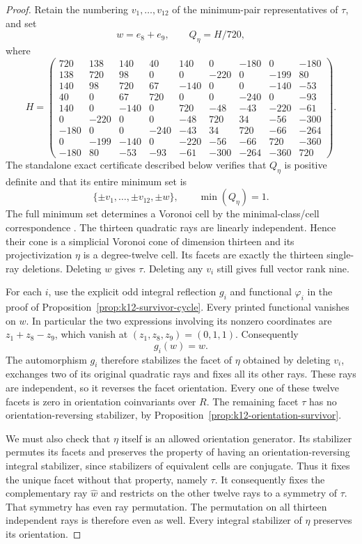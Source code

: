 \begin{proof}
Retain the numbering $v_1,\ldots,v_{12}$ of the minimum-pair
representatives of $\tau$, and set
\[
 w=e_8+e_9,\qquad Q_\eta=H/720,
\]
where
\begingroup
\setlength{\arraycolsep}{2.3pt}
\[
H=\begin{pmatrix}
720&138&140&40&140&0&-180&0&-180\\
138&720&98&0&0&-220&0&-199&80\\
140&98&720&67&-140&0&0&-140&-53\\
40&0&67&720&0&0&-240&0&-93\\
140&0&-140&0&720&-48&-43&-220&-61\\
0&-220&0&0&-48&720&34&-56&-300\\
-180&0&0&-240&-43&34&720&-66&-264\\
0&-199&-140&0&-220&-56&-66&720&-360\\
-180&80&-53&-93&-61&-300&-264&-360&720
\end{pmatrix}.
\]
\endgroup
The standalone exact certificate described below verifies that
$Q_\eta$ is positive definite and that its entire minimum set is
\[
              \{\pm v_1,\ldots,\pm v_{12},\pm w\},
              \qquad \min(Q_\eta)=1.                     \tag{CB.2}
\]
The full minimum set determines a Voronoi cell by the
minimal-class/cell correspondence
\cite[\S1.2.1, p.~4; \S2.1, p.~6]{DEKM2026}.
The thirteen quadratic rays are linearly independent. Hence their
cone is a simplicial Voronoi cone of dimension thirteen and its
projectivization $\eta$ is a degree-twelve cell. Its facets are
exactly the thirteen single-ray deletions. Deleting $w$ gives
$\tau$. Deleting any $v_i$ still gives full vector rank nine.

For each $i$, use the explicit odd integral reflection $g_i$ and
functional $\varphi_i$ in the proof of
Proposition~\ref{prop:k12-survivor-cycle}. Every printed functional
vanishes on $w$. In particular the two expressions involving its
nonzero coordinates are $z_1+z_8-z_9$, which vanish at
$(z_1,z_8,z_9)=(0,1,1)$. Consequently
\[
 g_i(w)=w .
\]
The automorphism $g_i$ therefore stabilizes the facet of $\eta$
obtained by deleting $v_i$, exchanges two of its original
quadratic rays and fixes all its other rays. These rays are
independent, so it reverses the facet orientation. Every one of
these twelve facets is zero in orientation coinvariants over $R$.
The remaining facet $\tau$ has no orientation-reversing stabilizer,
by Proposition~\ref{prop:k12-orientation-survivor}.

We must also check that $\eta$ itself is an allowed orientation
generator. Its stabilizer permutes its facets and preserves the
property of having an orientation-reversing integral stabilizer,
since stabilizers of equivalent cells are conjugate. Thus it
fixes the unique facet without that property, namely $\tau$.
It consequently fixes the complementary ray $\widehat w$ and
restricts on the other twelve rays to a symmetry of $\tau$.
That symmetry has even ray permutation. The permutation on all
thirteen independent rays is therefore even as well. Every
integral stabilizer of $\eta$ preserves its orientation.


\end{proof}
